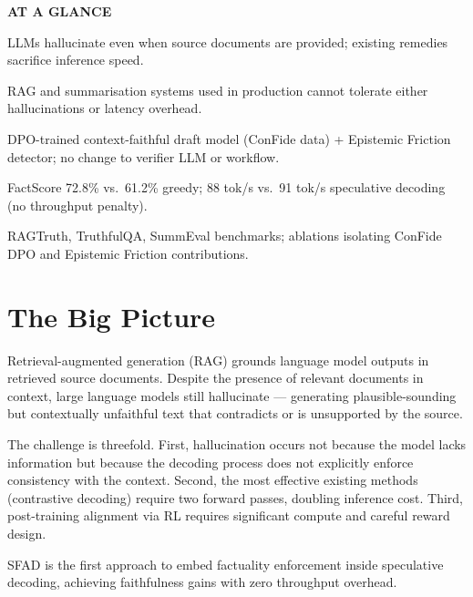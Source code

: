 \documentclass[10pt,twocolumn]{article}
\begin{document}
\begin{mdframed}[backgroundcolor=boxgray,linecolor=rulered,linewidth=1pt,
    innerleftmargin=6pt,innerrightmargin=6pt,
    innertopmargin=6pt,innerbottommargin=6pt]
\textbf{\small AT A GLANCE}\par\vspace{4pt}
\begin{description}[leftmargin=0pt,labelsep=4pt,itemsep=2pt,parsep=0pt,
    font=\small\bfseries]
  \item[Problem:] LLMs hallucinate even when source documents are
    provided; existing remedies sacrifice inference speed.
  \item[Why it matters:] RAG and summarisation systems used in
    production cannot tolerate either hallucinations or latency overhead.
  \item[Method:] DPO-trained context-faithful draft model (ConFide data)
    + Epistemic Friction detector; no change to verifier LLM or workflow.
  \item[Result:] FactScore 72.8\% vs.\ 61.2\% greedy; 88 tok/s
    vs.\ 91 tok/s speculative decoding (no throughput penalty).
  \item[Evidence:] RAGTruth, TruthfulQA, SummEval benchmarks; ablations
    isolating ConFide DPO and Epistemic Friction contributions.
\end{description}
\end{mdframed}

\section{The Big Picture}

Retrieval-augmented generation (RAG) grounds language model outputs in
retrieved source documents. Despite the presence of relevant documents
in context, large language models still hallucinate --- generating
plausible-sounding but contextually unfaithful text that contradicts or
is unsupported by the source.

The challenge is threefold. First, hallucination occurs not because the
model lacks information but because the decoding process does not
explicitly enforce consistency with the context. Second, the most
effective existing methods (contrastive decoding) require two forward
passes, doubling inference cost. Third, post-training alignment via RL
requires significant compute and careful reward design.

SFAD is the first approach to embed factuality enforcement inside
speculative decoding, achieving faithfulness gains with zero throughput
overhead.
\end{document}
